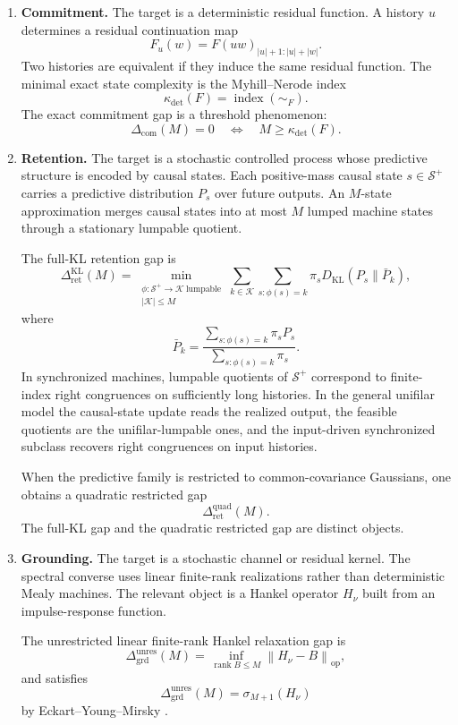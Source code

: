\documentclass[12pt]{article}
\theoremstyle{definition}
\newcommand{\norm}[1]{\left\lVert#1\right\rVert}
\newcommand{\RetKL}{\Delta_{\mathrm{ret}}^{\mathrm{KL}}}
\newcommand{\RetQuad}{\Delta_{\mathrm{ret}}^{\mathrm{quad}}}
\newcommand{\Dunres}{\Delta_{\mathrm{grd}}^{\mathrm{unres}}}
\newcommand{\Com}{\Delta_{\mathrm{com}}}
\newcommand{\Splus}{\mathcal S^{+}}
\begin{document}
\begin{enumerate}[label=(\arabic*),leftmargin=2.2em]
\item \textbf{Commitment.}
The target is a deterministic residual function.  A history $u$ determines a
residual continuation map
\[
F_u(w)=F(uw)_{|u|+1:|u|+|w|}.
\]
Two histories are equivalent if they induce the same residual function.  The
minimal exact state complexity is the Myhill--Nerode index
\[
\kappa_{\det}(F)
=
\operatorname{index}(\sim_F).
\]
The exact commitment gap is a threshold phenomenon:
\[
\Com(M)=0
\quad\Longleftrightarrow\quad
M\ge\kappa_{\det}(F).
\]

\item \textbf{Retention.}
The target is a stochastic controlled process whose predictive structure is
encoded by causal states.  Each positive-mass causal state $s\in\Splus$
carries a predictive distribution $P_s$ over future outputs.  An $M$-state
approximation merges causal states into at most $M$ lumped machine states
through a stationary lumpable quotient.

The full-KL retention gap is
\[
\RetKL(M)
=
\min_{\substack{
\phi:\Splus\to\mathcal K\ \text{lumpable}\\
|\mathcal K|\le M
}}
\sum_{k\in\mathcal K}
\sum_{s:\phi(s)=k}
\pi_s
D_{\mathrm{KL}}(P_s\|\bar P_k),
\]
where
\[
\bar P_k
=
\frac{
\sum_{s:\phi(s)=k}\pi_s P_s
}{
\sum_{s:\phi(s)=k}\pi_s
}.
\]
In synchronized machines, lumpable quotients of $\Splus$ correspond to
finite-index right congruences on sufficiently long histories.  In the general
unifilar model the causal-state update reads the realized output, the feasible
quotients are the unifilar-lumpable ones, and the input-driven synchronized
subclass recovers right congruences on input histories.

When the predictive family is restricted to common-covariance Gaussians, one
obtains a quadratic restricted gap
\[
\RetQuad(M).
\]
The full-KL gap and the quadratic restricted gap are distinct objects.

\item \textbf{Grounding.}
The target is a stochastic channel or residual kernel.  The spectral converse
uses linear finite-rank realizations rather than deterministic Mealy
machines.  The relevant object is a Hankel operator $H_\nu$ built from an
impulse-response function.

The unrestricted linear finite-rank Hankel relaxation gap is
\[
\Dunres(M)
=
\inf_{\operatorname{rank}B\le M}
\norm{H_\nu-B}_{\mathrm{op}},
\]
and satisfies
\[
\Dunres(M)
=
\sigma_{M+1}(H_\nu)
\]
by Eckart--Young--Mirsky \cite{eckart1936,mirsky1960}.


\end{enumerate}
\end{document}
